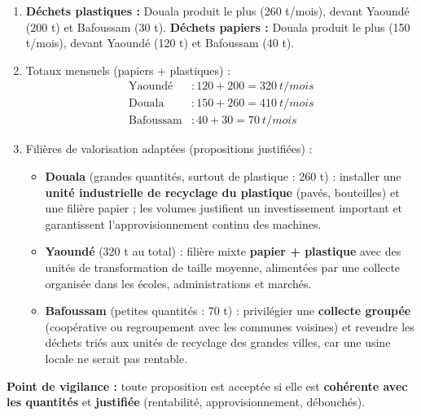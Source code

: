 \documentclass[11pt]{article}
\begin{document}
\begin{corrige}
\begin{enumerate}
\item \textbf{Déchets plastiques :} Douala produit le plus (260 t/mois), devant Yaoundé (200 t) et Bafoussam (30 t). \textbf{Déchets papiers :} Douala produit le plus (150 t/mois), devant Yaoundé (120 t) et Bafoussam (40 t).
\item Totaux mensuels (papiers + plastiques) :
\begin{align*}
\text{Yaoundé} &: 120 + 200 = \SI{320}{t/mois}\\
\text{Douala} &: 150 + 260 = \SI{410}{t/mois}\\
\text{Bafoussam} &: 40 + 30 = \SI{70}{t/mois}
\end{align*}
\item Filières de valorisation adaptées (propositions justifiées) :
\begin{itemize}
\item \textbf{Douala} (grandes quantités, surtout de plastique : 260 t) : installer une \textbf{unité industrielle de recyclage du plastique} (pavés, bouteilles) et une filière papier ; les volumes justifient un investissement important et garantissent l'approvisionnement continu des machines.
\item \textbf{Yaoundé} (320 t au total) : filière mixte \textbf{papier + plastique} avec des unités de transformation de taille moyenne, alimentées par une collecte organisée dans les écoles, administrations et marchés.
\item \textbf{Bafoussam} (petites quantités : 70 t) : privilégier une \textbf{collecte groupée} (coopérative ou regroupement avec les communes voisines) et revendre les déchets triés aux unités de recyclage des grandes villes, car une usine locale ne serait pas rentable.
\end{itemize}
\end{enumerate}
\textbf{Point de vigilance :} toute proposition est acceptée si elle est \textbf{cohérente avec les quantités} et \textbf{justifiée} (rentabilité, approvisionnement, débouchés).
\end{corrige}
\end{document}
